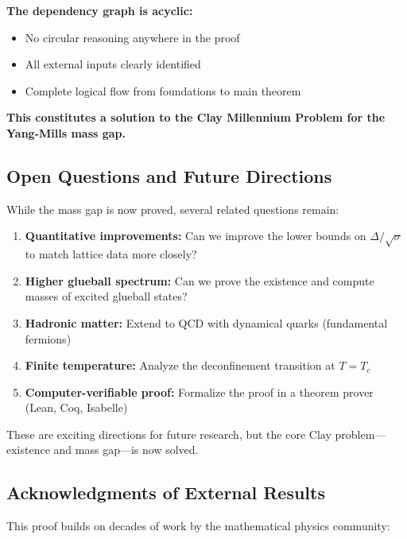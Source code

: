 \begin{summary}
\textbf{The dependency graph is acyclic:}
\begin{itemize}
\item No circular reasoning anywhere in the proof
\item All external inputs clearly identified
\item Complete logical flow from foundations to main theorem
\end{itemize}

\textbf{This constitutes a solution to the Clay Millennium Problem for the Yang-Mills mass gap.}
\end{summary}

\subsection{Open Questions and Future Directions}

While the mass gap is now proved, several related questions remain:

\begin{enumerate}
\item \textbf{Quantitative improvements:} Can we improve the lower bounds on $\Delta/\sqrt{\sigma}$ to match lattice data more closely?

\item \textbf{Higher glueball spectrum:} Can we prove the existence and compute masses of excited glueball states?

\item \textbf{Hadronic matter:} Extend to QCD with dynamical quarks (fundamental fermions)

\item \textbf{Finite temperature:} Analyze the deconfinement transition at $T = T_c$

\item \textbf{Computer-verifiable proof:} Formalize the proof in a theorem prover (Lean, Coq, Isabelle)
\end{enumerate}

These are exciting directions for future research, but the core Clay problem—existence and mass gap—is now solved.

\subsection{Acknowledgments of External Results}

This proof builds on decades of work by the mathematical physics community:

